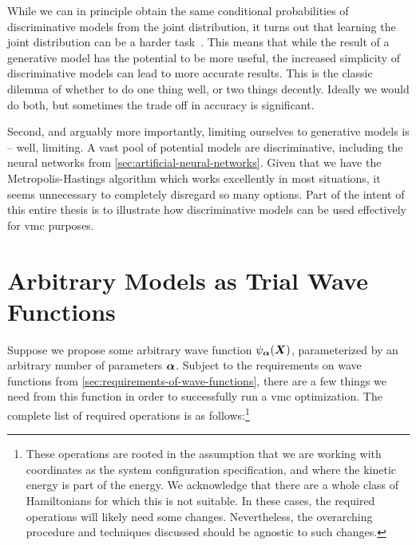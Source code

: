 \documentclass[Thesis.tex]{subfiles}
\begin{document}
While we can in principle obtain the same conditional probabilities of
discriminative models from the joint distribution, it turns out that learning
the joint distribution can be a harder task~\cite{Ng-2001}. This means that
while the result of a generative model has the potential to be more useful, the
increased simplicity of discriminative models can lead to more accurate results.
This is the classic dilemma of whether to do one thing well, or two things
decently. Ideally we would do both, but sometimes the trade off in accuracy is
significant.

Second, and arguably more importantly, limiting ourselves to generative models
is -- well, limiting. A vast pool of potential models are discriminative,
including the neural networks from \cref{sec:artificial-neural-networks}. Given
that we have the Metropolis-Hastings algorithm which works excellently in
most situations, it seems unnecessary to completely disregard so many options.
Part of the intent of this entire thesis is to illustrate how discriminative
models can be used effectively for \gls{vmc} purposes.


\section{Arbitrary Models as Trial Wave Functions}
\label{sec:arbitrary-models-as-trial-wave-functions}

Suppose we propose some arbitrary wave function $\psi_{\bm{\alpha}}(\bm{X})$, parameterized
by an arbitrary number of parameters $\bm{\alpha}$. Subject to the
requirements on wave functions from \cref{sec:requirements-of-wave-functions},
there are a few things we need from this function in order to successfully run a
\gls{vmc} optimization. The complete list of required operations is as
follows:\footnote{These operations are rooted in the assumption that we are
  working with coordinates as the system configuration specification, and where
  the kinetic energy is part of the energy. We acknowledge that there are a
  whole class of Hamiltonians for which this is not suitable. In these cases,
  the required operations will likely need some changes. Nevertheless, the overarching
  procedure and techniques discussed should be agnostic to such changes.}
\end{document}
